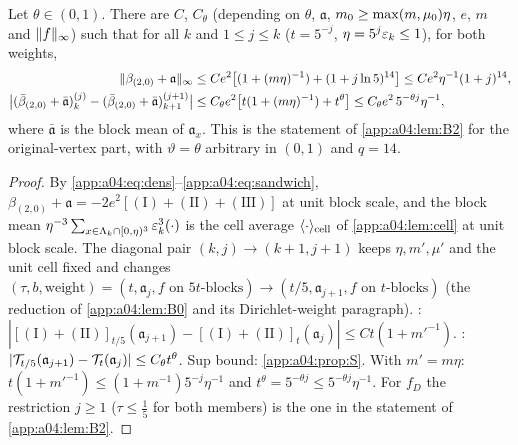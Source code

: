 \begin{theorem}\label{app:a04:thm:B2orig}
Let $\theta\in(0,1)$. There are $C$, $C_\theta$ (depending on $\theta$, $\mathfrak a$, $m_0\ge\max(m,\mu_0)\eta$, $e$, $m$ and $\lVert f\rVert_\infty$) such that for all $k$ and $1\le j\le k$ ($t=5^{-j}$, $\eta=5^j\varepsilon_k\le1$), for both weights,
\begin{align*}
\lVert \beta_{(2,0)}+\mathfrak a\rVert_\infty&\le Ce^2\big[(1+(m\eta)^{-1})+(1+j\ln5)^{14}\big]\le Ce^2\eta^{-1}(1+j)^{14},\\
\big|(\bar\beta_{(2,0)}+\bar{\mathfrak a})^{(j)}_k-(\bar\beta_{(2,0)}+\bar{\mathfrak a})^{(j+1)}_{k+1}\big|&\le C_\theta e^2\big[t(1+(m\eta)^{-1})+t^\theta\big]\le C_\theta e^2\,5^{-\theta j}\eta^{-1},
\end{align*}
where $\bar{\mathfrak a}$ is the block mean of $\mathfrak a_x$. This is the statement of \cref{app:a04:lem:B2} for the original-vertex part, with $\vartheta=\theta$ arbitrary in $(0,1)$ and $q=14$.
\end{theorem}
\begin{proof}
By \eqref{app:a04:eq:dens}--\eqref{app:a04:eq:sandwich}, $\beta_{(2,0)}+\mathfrak a=-2e^2[(\mathrm I)+(\mathrm{II})+(\mathrm{III})]$ at unit block scale, and the block mean $\eta^{-3}\sum_{x\in\Lambda_k\cap[0,\eta)^3}\varepsilon_k^3(\cdot)$ is the cell average $\langle\cdot\rangle_{\mathrm{cell}}$ of \cref{app:a04:lem:cell} at unit block scale. The diagonal pair $(k,j)\to(k+1,j+1)$ keeps $\eta,m',\mu'$ and the unit cell fixed and changes $(\tau,b,\text{weight})=(t,\mathfrak a_j,f\text{ on }5t\text{-blocks})\to(t/5,\mathfrak a_{j+1},f\text{ on }t\text{-blocks})$ (the reduction of \cref{app:a04:lem:B0} and its Dirichlet-weight paragraph). : $|[(\mathrm I)+(\mathrm{II})]_{t/5}(\mathfrak a_{j+1})-[(\mathrm I)+(\mathrm{II})]_t(\mathfrak a_j)|\le Ct(1+m'^{-1})$. : $|\mathcal T_{t/5}(\mathfrak a_{j+1})-\mathcal T_t(\mathfrak a_j)|\le C_\theta t^\theta$. Sup bound: \cref{app:a04:prop:S}. With $m'=m\eta$: $t(1+m'^{-1})\le(1+m^{-1})5^{-j}\eta^{-1}$ and $t^\theta=5^{-\theta j}\le5^{-\theta j}\eta^{-1}$. For $f_D$ the restriction $j\ge1$ ($\tau\le\frac15$ for both members) is the one in the statement of \cref{app:a04:lem:B2}.
\end{proof}
